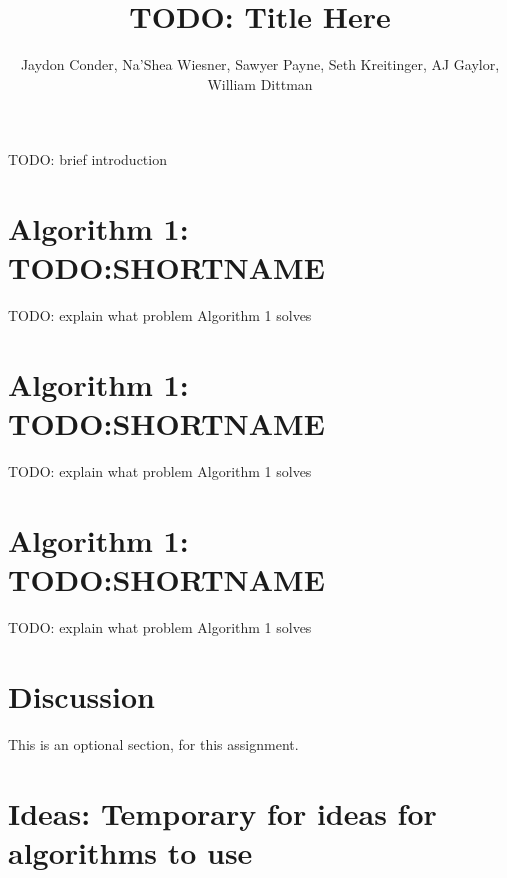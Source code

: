 \documentclass[11pt]{article}
\title{TODO: Title Here}
\author{Jaydon Conder, Na’Shea Wiesner, Sawyer Payne, Seth Kreitinger, AJ Gaylor, William Dittman}
\begin{document}
\maketitle

TODO: brief introduction

\section{Algorithm 1: TODO:SHORTNAME}
TODO: explain what problem Algorithm 1 solves

\section{Algorithm 1: TODO:SHORTNAME}
TODO: explain what problem Algorithm 1 solves

\section{Algorithm 1: TODO:SHORTNAME}
TODO: explain what problem Algorithm 1 solves

\section{Discussion}
This is an optional section, for this assignment.

\section{Ideas: Temporary for ideas for algorithms to use} {}
\end{document}
